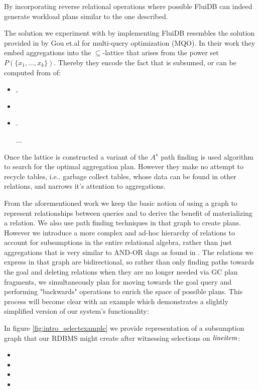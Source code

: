 By incorporating reverse relational operations where possible FluiDB
can indeed generate workload plans similar to the one described.

The solution we experiment with by implementing FluiDB resembles the
solution provided in \cite{gouSupSearchEfficient2006} by Gou et.al for
multi-query optimization (MQO). In their work they embed aggregations  into the \(\subseteq\)-lattice that arises from the power set
\(P(\{x_1, ..., x_k\})\). Thereby they encode the fact that  is subsumed, or can be computed from of:
\begin{itemize}
\item {},
 \item {}
 \item {}.
 \item[...]
\end{itemize}

Once the lattice is constructed a variant of the \(A^{\star}\) path finding is
used algorithm to search for the optimal aggregation plan. However
they make no attempt to recycle tables, i.e.. garbage collect tables,
whose data can be found in other relations, and narrows it's attention
to aggregations.

From the aforementioned work we keep the basic notion of using a graph
to represent relationships between queries and to derive the benefit
of materializing a relation. We also use path finding techniques in
that graph to create plans. However we introduce a more complex and
ad-hoc hierarchy of relations to account for subsumptions in the entire
relational algebra, rather than just aggregations that is very
similar to AND-OR dags as found in
\cite{mistryMaterializedViewSelection2001}.  The relations we express
in that graph are bidirectional, so rather than only finding paths
towards the goal and deleting relations when they are no longer needed
via GC plan fragments, we simultaneously plan for moving towards the
goal query and performing "backwards" operations to enrich the space
of possible plans. This process will become clear with an example which demonstrates
a slightly simplified version of our system's functionality:

In figure \ref{fig:intro_selectexample} we provide representation of a
subsumption graph that our RDBMS might create after witnessing
selections on \(\mathit{lineitem}\):
\begin{itemize}
    \item {}
    \item {}
    \item {}
    \item {}
\end{itemize}

